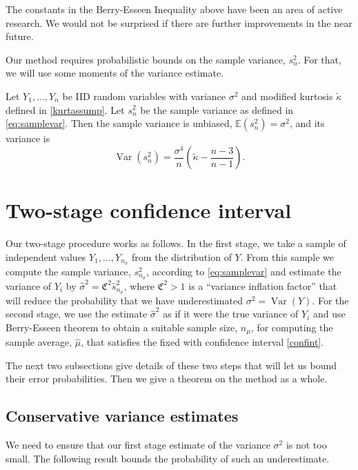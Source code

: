 \documentclass[graybox]{svmult}
\newcommand{\fudge}{\mathfrak{C}}
\newcommand\e{\mathbb{E}}
\DeclareMathOperator{\var}{Var}
\newcommand{\hmu}{\hat{\mu}}
\begin{document}
The constants in the Berry-Esseen Inequality above have been an area of active research.  We would not be surprised if there are further improvements in the near future.

Our method requires probabilistic bounds on the sample variance, $s_n^2$. For that,
we will use some moments of the variance estimate.

\begin{theorem} \cite[Eq.\ (7.16), p.\ 265]{Mil86} \label{Varvarthm} Let $Y_1, \ldots, Y_n$ be IID random variables with variance $\sigma^2$ and modified
kurtosis $\tilde \kappa$ defined in \eqref{kurtassump}.
Let  $s^2_n$ be the sample variance as defined in \eqref{eq:samplevar}.  Then the sample variance is unbiased, $\e(s^2_n)=\sigma^2$, and its variance is
\[
\var(s^2_n) = \frac{\sigma^4}{n} \left ( \tilde\kappa  - \frac{n-3}{n-1} \right).
\]
\end{theorem}

\section{Two-stage confidence interval}\label{sec:twostage}

Our two-stage procedure works as follows.
In the first stage, we take a sample of 
independent values $Y_1,\dots,Y_{n_\sigma}$
from the distribution of $Y$.
From this sample we compute the sample variance, 
$s^2_{n_\sigma}$, according to 
\eqref{eq:samplevar} and estimate
the variance of $Y_i$ by
$\hat\sigma^2 = \fudge^2\hat s_{n_\sigma}^2$, where
$\fudge^2>1$ is a ``variance inflation factor''
that will reduce the probability that we have
underestimated $\sigma^2=\var(Y)$.
For the second stage, we use the estimate
$\hat \sigma^2$ as if it were the true
variance of $Y_i$ and use
Berry-Esseen theorem to obtain a suitable
sample size, $n_{\mu}$, for computing the sample average, $\hmu$, that satisfies the fixed with confidence interval \eqref{confint}.

The next two subsections give details of
these two steps that will let us bound
their error probabilities. Then we give
a theorem on the method as a whole.


\subsection{Conservative variance estimates}

We need to ensure that our first stage estimate of the
variance $\sigma^2$ is not too small. The following
result bounds the probability of such an underestimate.
\end{document}
